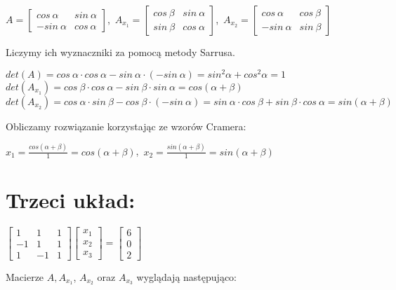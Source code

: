 \documentclass{article}
\begin{document}
\begin{center}
    $A = \begin{bmatrix}cos\ \alpha&sin\ \alpha\\-sin\ \alpha&cos\ \alpha\end{bmatrix}$,\ 
    $A_{x_1} = \begin{bmatrix}cos\ \beta&sin\ \alpha\\sin\ \beta&cos\ \alpha\end{bmatrix}$,\ 
    $A_{x_2} = \begin{bmatrix}cos\ \alpha&cos\ \beta\\-sin\ \alpha&sin\ \beta\end{bmatrix}$

\end{center}
\noindent
Liczymy ich wyznaczniki za pomocą metody Sarrusa.

\begin{center}
    $det(A) = cos\ \alpha \cdot cos\ \alpha - sin\ \alpha \cdot 
    (-sin\ \alpha) = sin^2\alpha + cos^2\alpha = 1$\\
    $det( A_{x_1} ) = cos\ \beta \cdot cos\ \alpha - sin\ \beta 
    \cdot sin\ \alpha = cos(\alpha + \beta)$\\
    $det( A_{x_2} ) = cos \ \alpha \cdot sin\ \beta - cos\ \beta 
    \cdot (-sin\ \alpha) = sin\ \alpha \cdot cos\ \beta + sin\ \beta\cdot cos\ \alpha = sin(\alpha + \beta)$
\end{center}
\noindent
Obliczamy rozwiązanie korzystając ze wzorów Cramera:
\begin{center}
    $x_1 = \frac{cos(\alpha + \beta)}{1} = cos(\alpha + \beta)$,\ 
    $x_2 = \frac{sin(\alpha + \beta)}{1} = sin(\alpha + \beta)$
\end{center}

\newpage
\section*{Trzeci układ:}

\begin{center}
    $\begin{bmatrix}1&1&1\\-1&1&1\\1&-1&1\end{bmatrix}
    \begin{bmatrix}x_1\\x_2\\x_3\end{bmatrix}=
    \begin{bmatrix}6\\0\\2\end{bmatrix}$
\end{center}
\noindent
Macierze $A, A_{x_1}$, $A_{x_2}$ oraz $A_{x_3}$ wyglądają następująco:
\end{document}
